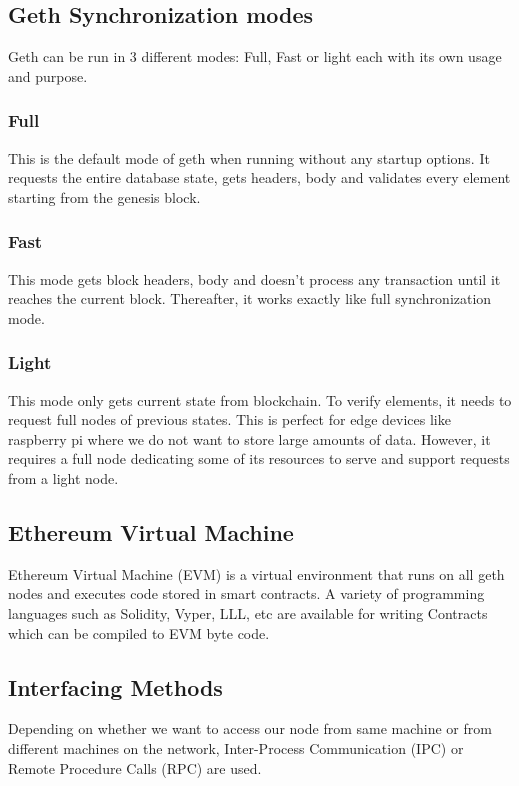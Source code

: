 \documentclass[11pt,openright]{report}
\begin{document}
\newpage
\subsection{Geth Synchronization modes}
Geth can be run in 3 different modes: Full, Fast or light each with its own usage and purpose.

\subsubsection{Full} 
This is the default mode of geth when running without any startup options. It requests the entire database state, gets headers, body and validates every element starting from the genesis block.

\subsubsection{Fast}
This mode gets block headers, body and doesn't process any transaction until it reaches the current block. Thereafter, it works exactly like full synchronization mode.

\subsubsection{Light}
This mode only gets current state from blockchain. To verify elements, it needs to request full nodes of previous states. This is perfect for edge devices like raspberry pi where we do not want to store large amounts of data. However, it requires a full node dedicating some of its resources to serve and support requests from a light node.

\subsection{Ethereum Virtual Machine}
Ethereum Virtual Machine (EVM) is a virtual environment that runs on all geth nodes and executes code stored in smart contracts. A variety of programming languages such as Solidity, Vyper, LLL, etc are available for writing Contracts which can be compiled to EVM byte code.

\subsection{Interfacing Methods}
Depending on whether we want to access our node from same machine or from different machines on the network, Inter-Process Communication (IPC) or Remote Procedure Calls (RPC) are used.
\end{document}
